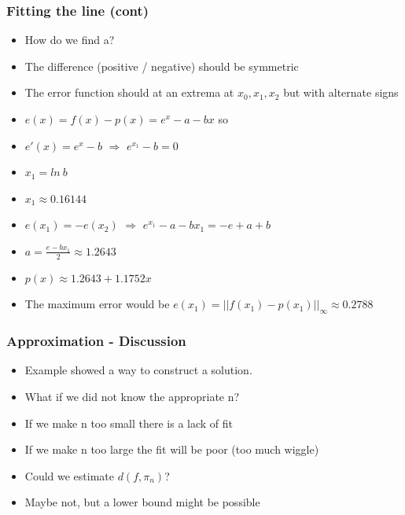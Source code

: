 \documentclass[10pt]{beamer}
\begin{document}
\begin{frame}
  \frametitle{Fitting the line (cont)}
  \begin{itemize}
  \item How do we find a? 
  \item The difference (positive / negative) should be symmetric
  \item The error function should at an extrema at $x_0, x_1, x_2$ but with alternate signs
  \item $e(x) = f(x) - p(x) = e^x - a - b x$ so
  \item $e'(x) = e^x - b$ $\Rightarrow$ $ e^{x_1} -b = 0$
  \item $x_1 = ln ~ b$
  \item $x_1 \approx 0.16144$ \pause
  \item $e(x_1) = -e(x_2)$ $\Rightarrow$ $e^{x_1} - a - b x_1 = -e + a + b$
  \item $a = \frac{e-b x_1}{2} \approx 1.2643$
  \item $p(x) \approx 1.2643 + 1.1752 x$
  \item The maximum error would be $e(x_1) = ||f(x_1) - p(x_1)||_{\infty} \approx 0.2788$
  \end{itemize}
\end{frame}

\begin{frame}
  \frametitle{Approximation - Discussion}
  \begin{itemize}
  \item Example showed a way to construct a solution.
  \item What if we did not know the appropriate n?
  \item If we make n too small there is a lack of fit
  \item If we make n too large the fit will be poor (too much wiggle)
  \item Could we estimate $d(f, \pi_n)$?
  \item Maybe not, but a lower bound might be possible
  \end{itemize}
\end{frame}
\end{document}

